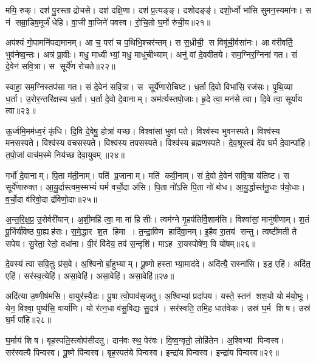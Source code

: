 मयि॒ रुक्। दश॑ पु॒रस्ताद्रोचसे। दश॑ दक्षि॒णा। दश॑ प्र॒त्यङ्ङ्। दशोदङ्ङ्॑। दशो॒र्ध्वो भा॑सि सुमन॒स्यमा॑नः। स न॑ सम्रा॒डिष॒मूर्जं॑ धेहि। वा॒जी वा॒जिने॑ पवस्व। रो॒चि॒तो घ॒र्मो रु॑ची॒य॥२१॥
\anuvakamend[रो॒च॒य॒ धे॒हि॒ नव॑ च]

अप॑श्यं गो॒पामनि॑पद्यमानम्। आ च॒ परा॑ च प॒थिभि॒श्चर॑न्तम्। स स॒ध्रीची॒ स विषू॑ची॒र्वसा॑नः। आ व॑रीवर्ति॒ भुव॑नेष्व॒न्तः। अत्र॑ प्रा॒वीः। मधु॒ माध्वीभ्यां॒ मधु॒ माधू॑चीभ्याम्। अनु॑ वां दे॒ववी॑तये। सम॒ग्निर॒ग्निना॑ गत। सं दे॒वेन॑ सवि॒त्रा। स सूर्ये॑ण रोचते॥२२॥

स्वाहा॒ सम॒ग्निस्तप॑सा गत। सं दे॒वेन॑ सवि॒त्रा। स सूर्ये॑णारोचिष्ट। ध॒र्ता दि॒वो विभा॑सि॒ रज॑सः। पृ॒थि॒व्या ध॒र्ता। उ॒रोर॒न्तरि॑क्षस्य ध॒र्ता। ध॒र्ता दे॒वो दे॒वानाम्। अम॑र्त्यस्तपो॒जाः। हृ॒दे त्वा॒ मन॑से त्वा। दि॒वे त्वा॒ सूर्या॑य त्वा॥२३॥

ऊ॒र्ध्वमि॒मम॑ध्व॒रं कृ॑धि। दि॒वि दे॒वेषु॒ होत्रा॑ यच्छ। विश्वा॑सां भुवां पते। विश्व॑स्य भुवनस्पते। विश्व॑स्य मनसस्पते। विश्व॑स्य वचसस्पते। विश्व॑स्य तपसस्पते। विश्व॑स्य ब्रह्मणस्पते। दे॒व॒श्रूस्त्वं दे॑व घर्म दे॒वान्पा॑हि। त॒पो॒जां वाच॑म॒स्मे निय॑च्छ देवा॒युवम्॥२४॥

गर्भो॑ दे॒वानाम्। पि॒ता म॑ती॒नाम्। पति॑ प्र॒जानाम्। मति॑ कवी॒नाम्। सं दे॒वो दे॒वेन॑ सवि॒त्रा य॑तिष्ट। स सूर्ये॑णारुक्त। आ॒यु॒र्दास्त्वम॒स्मभ्यं॑ घर्म वर्चो॒दा अ॑सि। पि॒ता नो॑ऽसि पि॒ता नो॑ बोध। आ॒यु॒र्द्धास्त॑नू॒धाः प॑यो॒धाः। व॒र्चो॒दा व॑रिवो॒दा द्र॑विणो॒दाः॥२५॥

अ॒न्त॒रि॒क्ष॒प्र॒ उ॒रोर्वरी॑यान्। अ॒शी॒महि॑ त्वा॒ मा मा॑ हिसीः। त्वम॑ग्ने गृ॒हप॑तिर्वि॒शाम॑सि। विश्वा॑सां॒ मानु॑षीणाम्। श॒तं पू॒र्भिर्य॑विष्ठ पा॒ह्यह॑सः। स॒मे॒द्धार श॒त हिमा। त॒न्द्रा॒विण हार्दिवा॒नम्। इ॒हैव रा॒तय॑ सन्तु। त्वष्टी॑मती ते सपेय। सु॒रेता॒ रेतो॒ दधा॑ना। वी॒रं  वि॑देय॒ तव॑ स॒न्दृशि॑। माऽह रा॒यस्पोषे॑ण॒ वि यो॑षम्॥२६॥
\anuvakamend[रो॒च॒ते॒ सूर्या॑य त्वा देवा॒युवं॑ द्रविणो॒दा दधा॑ना॒ द्वे च॑]


दे॒वस्य॑ त्वा सवि॒तुः प्र॑स॒वे। अ॒श्विनोर्बा॒हुभ्याम्। पू॒ष्णो हस्ताभ्या॒माद॑दे। अदि॑त्यै॒ रास्ना॑सि। इड॒ एहि॑। अदि॑त॒ एहि॑। सर॑स्व॒त्येहि॑। असा॒वेहि॑। असा॒वेहि॑। असा॒वेहि॑॥२७॥

अदि॑त्या उ॒ष्णीष॑मसि। वा॒युर॑स्यै॒डः। पू॒षा त्वो॒पाव॑सृजतु। अ॒श्विभ्यां॒ प्रदा॑पय। यस्ते॒ स्तन॑ शश॒यो यो म॑यो॒भूः। येन॒ विश्वा॒ पुष्य॑सि॒ वार्या॑णि। यो र॑त्न॒धा व॑सु॒विद्यः सु॒दत्र॑। सर॑स्वति॒ तमि॒ह धात॑वेकः। उस्र॑ घ॒र्म शिष। उस्र॑ घ॒र्मं पा॑हि॥२८॥

घ॒र्माय॑ शिष। बृह॒स्पति॒स्त्वोप॑सीदतु। दान॑वः स्थ॒ पेर॑वः। वि॒ष्व॒ग्वृतो॒ लोहि॑तेन। अ॒श्विभ्यां पिन्वस्व। सर॑स्वत्यै पिन्वस्व। पू॒ष्णे पि॑न्वस्व। बृह॒स्पत॑ये पिन्वस्व। इन्द्रा॑य पिन्वस्व। इन्द्रा॑य पिन्वस्व॥२९॥

